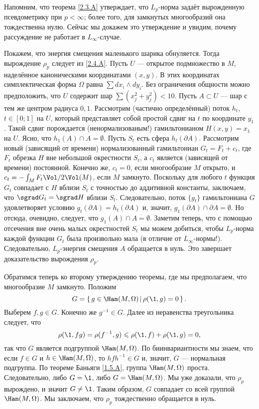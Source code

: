Напомним, что теорема \ref{2.3.A} утверждает, что $L_p$-норма задаёт вырожденную псевдометрику при $p <\infty$;
более того, для замкнутых многообразий она тождественна нулю.
Сейчас мы докажем это утверждение и увидим, почему рассуждение не работает в $L_\infty$-случае.

 Покажем, что энергия смещения маленького шарика обнуляется.
Тогда вырождение $\rho_p$ следует из \ref{2.4.A}.
Пусть $U$ --- открытое подмножество в $M$, наделённое каноническими координатами $(x, y)$.
В этих координатах симплектическая форма $\Omega$ равна $\sum dx_i\wedge dy_i$.
Без ограничения общности можно предположить, что $U$ содержит шар $\sum(x^2_j + y_j^2) <10$.
Пусть $A \subset U$ --- шар с тем же центром радиуса $0{,}1$.
Рассмотрим (частично определённый) поток $h_t$, $t \in [0; 1]$ на $U$, который представляет собой простой сдвиг на $t$ по координате $y_1$.
Такой сдвиг порождается (ненормализованым!) гамильтонианом $H (x, y) = x_1$ на $U$.
Ясно, что $h_1 (A) \cap A = \emptyset$.
Пусть $S_t$ есть сфера $h_t (\partial A)$.
Рассмотрим новый (зависящий от времени) нормализованный гамильтониан $G_t = F_t + c_t$, где $F_t$ обрезка $H$ вне небольшой окрестности $S_t$, а $c_t$ является (зависящей от времени) постоянной.
Конечно же, $c_t = 0$, если многообразие $M$ открыто, и $c_t = -\int_M F_t \Vol/2\Vol(M)$, если $M$ замкнуто.
Поскольку для любого $t$ функция $G_t$ совпадает с $H$ вблизи $S_t$ с точностью до аддитивной константы, заключаем, что $\sgrad G_t = \sgrad H$ вблизи $S_t$.
Следовательно, поток $\{g_t\}$ гамильтониана $G$ удовлетворяет условию $g_t (\partial A) = h_t (\partial A)$ и, значит, $g_1 (\partial A) \cap \partial A = \emptyset$.
Но отсюда, очевидно, следует, что $g_1 (A) \cap A = \emptyset$.
Заметим теперь, что с помощью отсечения вне очень малых окрестностей $S_t$ мы можем добиться, чтобы $L_p$-норма каждой функции $G_t$ была произвольно мала (в отличие от $L_\infty$-нормы!).
Следовательно, $L_p$-энергия смещения $A$ обращается в нуль.
Это завершает доказательство вырождения $\rho_p$.

Обратимся теперь ко второму утверждению теоремы, где мы предполагаем, что многообразие $M$ замкнуто.
Положим
\[G = \set{g \in \Ham (M, \Omega)}{\rho (\1, g) = 0}.\]
Выберем $f, g \in G$.
Конечно же $g^{-1} \in G$.
Далее из неравенства треугольника следует, что 
\[\rho (\1, f g) = \rho (f^{-1}, g) \le \rho (\1, f) + \rho (\1, g) = 0,\]
так что $G$ является подгруппой $\Ham (M, \Omega)$.
По биинвариантности  мы знаем, что если $f \in G$ и $h \in \Ham (M, \Omega)$, то $hf h^{-1} \in G$ и, значит, $G$ --- нормальная подгруппа.
По теореме Баньяги \ref{1.5.A}, группа $\Ham (M, \Omega)$ проста.
Следовательно, либо $G = {\1}$, либо $G = \Ham (M, \Omega)$.
Мы уже доказали, что $\rho_p$ вырождено, и значит $G \ne {\1}$.
Таким образом, $G$ совпадает со всей группой $\Ham (M, \Omega)$.
Мы заключаем, что $\rho_p$ тождественно обращается в нуль.
\qeds

